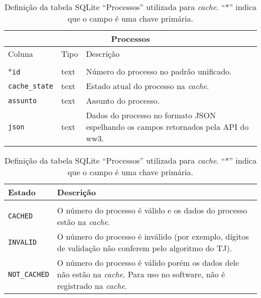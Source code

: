 \begin{table}[htb]
    \small
    \centering
    \begin{tabular}{llp{}}
        \toprule
        \multicolumn{3}{c}{Processos} \\
        \midrule
        Coluna & Tipo & Descrição \\
        \midrule \\
        *\texttt{id} & text & Número do processo no padrão unificado. \\
        \texttt{cache\_state} & text & Estado atual do processo na \textit{cache}. \\
        \texttt{assunto} & text & Assunto do processo. \\
        \texttt{json} & text & Dados do processo no formato JSON espelhando os campos retornados pela API do ww3. \\
        \bottomrule
    \end{tabular}
    \caption{%
        Definição da tabela SQLite ``Processos'' utilizada para \textit{cache}.
        ``*'' indica que o campo é uma chave primária.
    }
    \label{tbl:estrutura-tabela-processos}
\end{table}

\begin{table}[htb]
    \centering
    \begin{tabular}{lp{}}
        \toprule
        Estado & Descrição \\
        \midrule \\
        \texttt{CACHED} & O número do processo é válido e os dados do processo estão na \textit{cache}. \\
        \texttt{INVALID} & O número do processo é inválido (por exemplo, dígitos de validação não conferem pelo algoritmo do TJ). \\
        \texttt{NOT\_CACHED} & O número do processo é válido porém os dados dele não estão na \textit{cache}. Para uso no software, não é registrado na \textit{cache}. \\
        \bottomrule
    \end{tabular}
    \caption{%
        Definição da tabela SQLite ``Processos'' utilizada para \textit{cache}.
        ``*'' indica que o campo é uma chave primária.
    }
    \label{tbl:valores-coluna-state}
\end{table}


%

